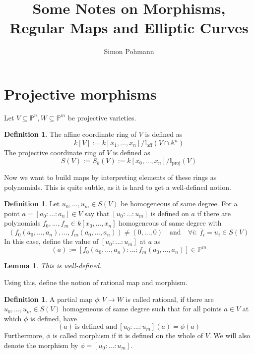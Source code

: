 \documentclass{scrartcl}
\title{Some Notes on Morphisms, Regular Maps and Elliptic Curves}
\author{Simon Pohmann}
\newtheorem{lemma}[prop]{Lemma}
\theoremstyle{definition}
\newtheorem{definition}[prop]{Definition}
\begin{document}
\maketitle

\tableofcontents

\section{Projective morphisms}
Let $V \subseteq \mathbb{P}^n, W \subseteq \mathbb{P}^m$ be projective varieties.

\begin{definition}
    The affine coordinate ring of $V$ is defined as 
    \begin{equation*}
        k[V] := k[x_1, ..., x_n]/\mathbb{I}_{\mathrm{aff}}(V \cap \mathbb{A}^n)
    \end{equation*}
    The projective coordinate ring of $V$ is defined as
    \begin{equation*}
        S(V) := S_k(V) := k[x_0, ..., x_n]/\mathbb{I}_{\mathrm{proj}}(V)
    \end{equation*}
\end{definition}
Now we want to build maps by interpreting elements of these rings as polynomials.
This is quite subtle, as it is hard to get a well-defined notion.
\begin{definition}
    Let $u_0, ..., u_m \in S(V)$ be homogeneous of same degree.
    For a point $a = [a_0 : ... : a_n] \in V$ say that $[u_0 : ... : u_m]$ is defined on $a$ if there are polynomials $f_0, ..., f_m \in k[x_0, ..., x_n]$ homogeneous of same degree with
    \begin{equation*}
        (f_0(a_0, ..., a_n), ..., f_m(a_0, ..., a_n)) \neq (0, ..., 0) \quad \text{and} \quad \forall i: \ \overline{f}_i = u_i \in S(V)
    \end{equation*}
    In this case, define the value of $[u_0 : ... : u_m]$ at $a$ as
    \begin{equation*}
        [u_0 : ... : u_m](a) := [f_0(a_0, ..., a_n) : ... : f_m(a_0, ..., a_n)] \in \mathbb{P}^m
    \end{equation*}
\end{definition}
\begin{lemma}
    This is well-defined.
\end{lemma}
Using this, define the notion of rational map and morphism.
\begin{definition}
    A partial map $\phi: V \to W$ is called rational, if there are $u_0, ..., u_m \in S(V)$ homogeneous of same degree such that for all points $a \in V$ at which $\phi$ is defined, have
    \begin{equation*}
        [u_0 : ... : u_m](a) \ \text{is defined and} \ [u_0 : ... : u_m](a) = \phi(a)
    \end{equation*}
    Furthermore, $\phi$ is called morphism if it is defined on the whole of $V$.
    We will also denote the morphism by $\phi = [u_0 : ... : u_m]$.
\end{definition}
\end{document}
